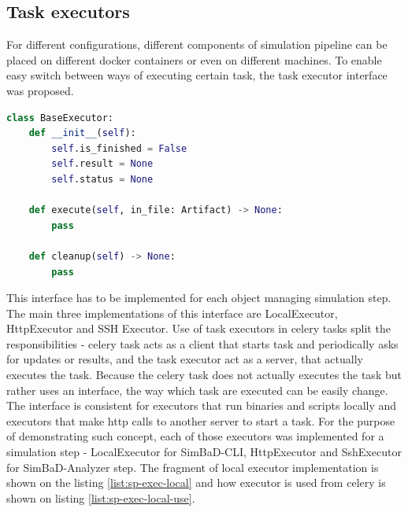 \subsection{Task executors}
For different configurations, different components of simulation pipeline can be placed on different docker containers or even on different machines. To enable easy switch between ways of executing certain task, the task executor interface was proposed. 
\begin{lstlisting}[label=list:sp-ex-base,caption=Base executor, basicstyle=\footnotesize\ttfamily, language=python]
class BaseExecutor:
    def __init__(self):
        self.is_finished = False
        self.result = None
        self.status = None

    def execute(self, in_file: Artifact) -> None:
        pass

    def cleanup(self) -> None:
        pass
\end{lstlisting}
This interface has to be implemented for each object managing simulation step. The main three implementations of this interface are LocalExecutor, HttpExecutor and SSH Executor. Use of task executors in celery tasks split the responsibilities - celery task acts as a client that starts task and periodically asks for updates or results, and the task executor act as a server, that actually executes the task. Because the celery task does not actually executes the task but rather uses an interface, the way which task are executed can be easily change. The interface is consistent for executors that run binaries and scripts locally and executors that make http calls to another server to start a task.
For the purpose of demonstrating such concept, each of those executors was implemented for a simulation step - LocalExecutor for SimBaD-CLI, HttpExecutor and SshExecutor for SimBaD-Analyzer step. The fragment of local executor implementation is shown on the listing \ref{list:sp-exec-local} and how executor is used from celery is shown on listing \ref{list:sp-exec-local-use}.
